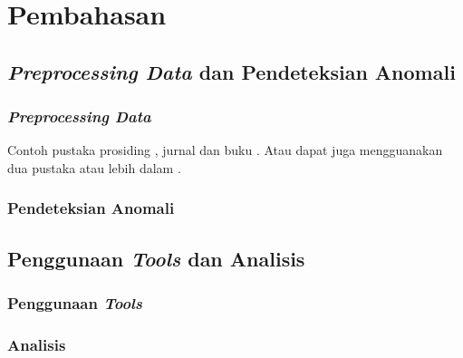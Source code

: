 \chapter{Pembahasan}

\section{\emph{Preprocessing Data} dan Pendeteksian Anomali}

\subsection{\emph{Preprocessing Data}}
Contoh pustaka prosiding \cite{doyen2014explicit}, jurnal \cite{gunawan2015hydrostatic} dan buku \cite{toro2013riemann}. Atau dapat juga mengguanakan dua pustaka atau lebih dalam \cite{gunawan2015hydrostatic,toro2013riemann}.

\subsection{Pendeteksian Anomali}

\section{Penggunaan \emph{Tools} dan Analisis}

\subsection{Penggunaan \emph{Tools}}

\subsection{Analisis}
